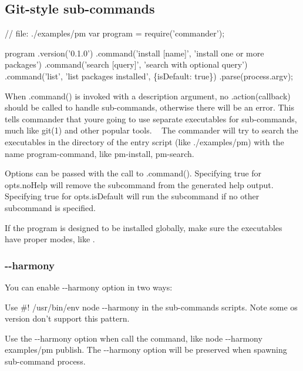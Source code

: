 \subsection*{Git-\/style sub-\/commands}


\begin{DoxyCode}
// file: ./examples/pm
var program = require('commander');

program
  .version('0.1.0')
  .command('install [name]', 'install one or more packages')
  .command('search [query]', 'search with optional query')
  .command('list', 'list packages installed', \{isDefault: true\})
  .parse(process.argv);
\end{DoxyCode}


When {\ttfamily .command()} is invoked with a description argument, no {\ttfamily .action(callback)} should be called to handle sub-\/commands, otherwise there will be an error. This tells commander that you\textquotesingle{}re going to use separate executables for sub-\/commands, much like {\ttfamily git(1)} and other popular tools. ~\newline
The commander will try to search the executables in the directory of the entry script (like {\ttfamily ./examples/pm}) with the name {\ttfamily program-\/command}, like {\ttfamily pm-\/install}, {\ttfamily pm-\/search}.

Options can be passed with the call to {\ttfamily .command()}. Specifying {\ttfamily true} for {\ttfamily opts.\+no\+Help} will remove the subcommand from the generated help output. Specifying {\ttfamily true} for {\ttfamily opts.\+is\+Default} will run the subcommand if no other subcommand is specified.

If the program is designed to be installed globally, make sure the executables have proper modes, like {}.

\subsubsection*{{\ttfamily -\/-\/harmony}}

You can enable {\ttfamily -\/-\/harmony} option in two ways\+:
\begin{DoxyItemize}
\item Use {\ttfamily \#! /usr/bin/env node -\/-\/harmony} in the sub-\/commands scripts. Note some os version don’t support this pattern.
\item Use the {\ttfamily -\/-\/harmony} option when call the command, like {\ttfamily node -\/-\/harmony examples/pm publish}. The {\ttfamily -\/-\/harmony} option will be preserved when spawning sub-\/command process.
\end{DoxyItemize}

